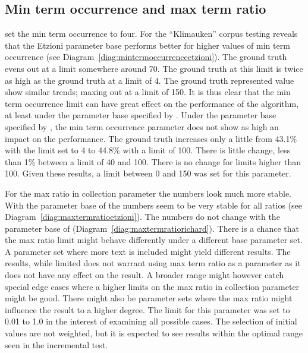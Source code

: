 \subsection{Min term occurrence and max term ratio}
\citeauthor{Oren1998} set the min term occurrence to four. For the ``Klimauken'' corpus testing reveals that the Etzioni parameter base performs better for higher values of min term occurrence (see Diagram~\ref{diag:mintermoccurrenceetzioni}). The ground truth evens out at a limit somewhere around 70. The ground truth at this limit is twice as high as the ground truth at a limit of 4. The ground truth represented value show similar trends; maxing out at a limit of 150. It is thus clear that the min term occurrence limit can have great effect on the performance of the \CTC algorithm, at least under the parameter base specified by \citeauthor{Oren1998}. Under the parameter base specified by \supervisor, the min term occurrence parameter does not show as high an impact on the performance. The ground truth increases only a little from 43.1\% with the limit set to 4 to 44.8\% with a limit of 100. There is little change, less than 1\% between a limit of 40 and 100. There is no change for limits higher than 100. Given these results, a limit between 0 and 150 was set for this parameter.

For the max ratio in collection parameter the numbers look much more stable. With the parameter base of \citeauthor{Oren1998} the numbers seem to be very stable for all ratios (see Diagram~\ref{diag:maxtermratioetzioni}). The numbers do not change with the parameter base of \supervisor (Diagram~\ref{diag:maxtermratiorichard}). There is a chance that the max ratio limit might behave differently under a different base parameter set. A parameter set where more text is included might yield different results. The results, while limited does not warrant using max term ratio as a parameter as it does not have any effect on the result. A broader range might however catch special edge cases where a higher limits on the max ratio in collection parameter might be good. There might also be parameter sets where the max ratio might influence the result to a higher degree. The limit for this parameter was set to 0.01 to 1.0 in the interest of examining all possible cases. The selection of initial values are not weighted, but it is expected to see results within the optimal range seen in the incremental test.

